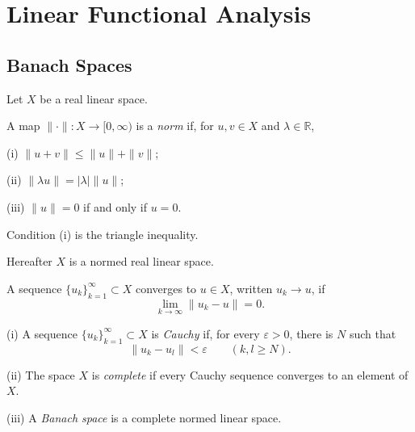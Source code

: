 
\section{Linear Functional Analysis}
\label{sec:linear-functional-analysis}

\subsection{Banach Spaces}
\label{sec:banach-spaces}

Let $X$ be a real linear space.

\begin{definition}[Norm]
\label{def:norm-normed-linear-space}
A map $\|\cdot\|:X\to[0,\infty)$ is a \textit{norm} if, for $u,v\in X$ and $\lambda\in\mathbb R$,

(i) $\|u+v\|\leq\|u\|+\|v\|$;

(ii) $\|\lambda u\|=|\lambda|\|u\|$;

(iii) $\|u\|=0$ if and only if $u=0$.

Condition (i) is the triangle inequality.
\end{definition}

Hereafter $X$ is a normed real linear space.

\begin{definition}
\label{def:convergence-normed-space}

A sequence $\{u_k\}_{k=1}^\infty\subset X$ converges to $u\in X$, written $u_k\to u$, if
\[
\lim_{k\to\infty}\|u_k-u\|=0.
\]
\end{definition}

\begin{definition}
\label{def:cauchy-sequence-complete-banach-space}

(i) A sequence $\{u_k\}_{k=1}^\infty\subset X$ is \textit{Cauchy} if, for every $\varepsilon>0$, there is $N$ such that
\[
\|u_k-u_l\|<\varepsilon\qquad(k,l\geq N).
\]

(ii) The space $X$ is \textit{complete} if every Cauchy sequence converges to an element of $X$.

(iii) A \textit{Banach space} is a complete normed linear space.
\end{definition}

